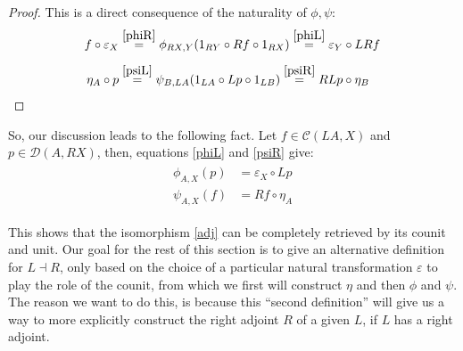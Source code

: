 \begin{proof}
This is a direct consequence of the naturality of $\phi,\psi$:
\begin{align*}
f\circ\varepsilon_X&\overset{\eqref{phiR}}{=}\phi_{RX,Y}(1_{RY}\circ Rf\circ 1_{RX})\overset{\eqref{phiL}}{=}\varepsilon_Y\circ LRf\\[0.5em]
\eta_A\circ p&\overset{\eqref{psiL}}{=}\psi_{B,LA}(1_{LA}\circ Lp\circ 1_{LB})\overset{\eqref{psiR}}{=}RLp\circ\eta_B\qedhere
\end{align*}
\end{proof}

So, our discussion leads to the following fact. Let $f\in\mathcal{C}(LA,X)$ and $p\in\mathcal{D}(A,RX)$, then, equations \eqref{phiL} and \eqref{psiR} give:
\begin{align}
\begin{split}
\phi_{A,X}(p)&=\varepsilon_X\circ Lp\\[0.8em]
\psi_{A,X}(f)&=Rf\circ\eta_A
\end{split}\label{iso_from_unit}
\end{align}

This shows that the isomorphism \eqref{adj} can be completely retrieved by its counit and unit. Our goal for the rest of this section is to give an alternative definition for $L\dashv R$, only based on the choice of a particular natural transformation $\varepsilon$ to play the role of the counit, from which we first will construct $\eta$ and then $\phi$ and $\psi$. The reason we want to do this, is because this ``second definition'' will give us a way to more explicitly construct the right adjoint $R$ of a given $L$, if $L$ has a right adjoint.

